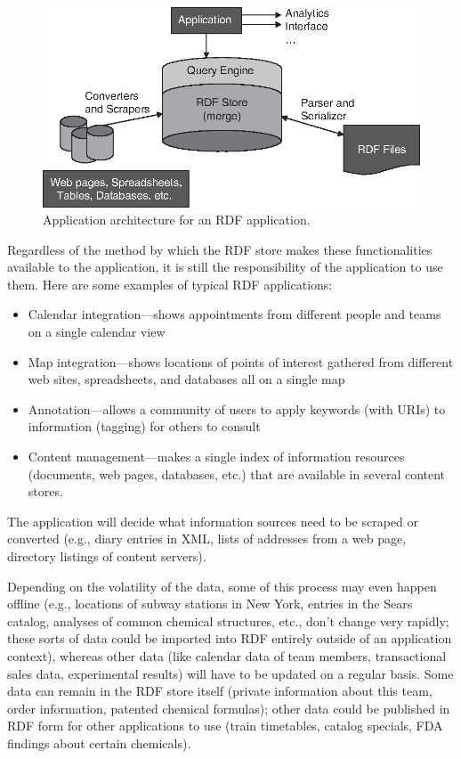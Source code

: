 \begin{figure}
    \centering
    \includegraphics[width=5.0in]{media/ch4/f04-02-9780123859655.eps}
    \caption{Application architecture for an RDF application.}
    \label{fig:ch4.2}
\end{figure}

Regardless of the method by which the RDF store makes these
functionalities available to the application, it is still the
responsibility of the application to use them. Here are some examples of
typical RDF applications:

\begin{itemize}
    \item Calendar integration---shows appointments from different people and
teams on a single calendar view
    \item Map integration---shows locations of points of interest gathered from
different web sites, spreadsheets, and databases all on a single map
    \item Annotation---allows a community of users to apply keywords (with URIs)
to information (tagging) for others to consult
    \item Content management---makes a single index of information resources
(documents, web pages, databases, etc.) that are available in several
content stores.
\end{itemize}

The application will decide what information sources need to be scraped
or converted (e.g., diary entries in XML, lists of addresses from a web
page, directory listings of content servers).

Depending on the volatility of the data, some of this process may even
happen offline (e.g., locations of subway stations in New York, entries
in the Sears catalog, analyses of common chemical structures, etc.,
don't change very rapidly; these sorts of data could be imported into
RDF entirely outside of an application context), whereas other data
(like calendar data of team members, transactional sales data,
experimental results) will have to be updated on a regular basis. Some
data can remain in the RDF store itself (private information about this
team, order information, patented chemical formulas); other data could
be published in RDF form for other applications to use (train
timetables, catalog specials, FDA findings about certain chemicals).

